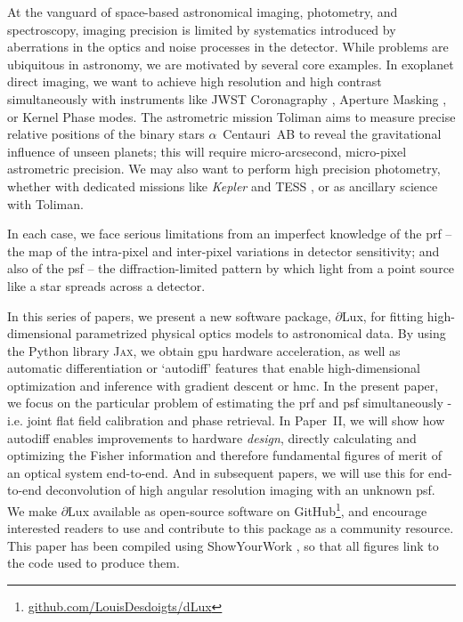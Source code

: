 \documentclass[]{spieman}
\newcommand\dlux{$\partial$Lux\xspace}
\begin{document}
At the vanguard of space-based astronomical imaging, photometry, and spectroscopy, imaging precision is limited by systematics introduced by aberrations in the optics and noise processes in the detector. While problems are ubiquitous in astronomy, we are motivated by several core examples. In exoplanet direct imaging, we want to achieve high resolution and high contrast simultaneously with instruments like JWST Coronagraphy \cite{Girard2022}, Aperture Masking \cite{Sivaramakrishnan2022}, or Kernel Phase \cite{Martinache2010,Kammerer2022} modes. The astrometric mission Toliman \cite{tuthill2018} aims to measure precise relative positions of the binary stars $\alpha$~Centauri~AB to reveal the gravitational influence of unseen planets; this will require micro-arcsecond, micro-pixel astrometric precision. We may also want to perform high precision photometry, whether with dedicated missions like \textit{Kepler} \cite{Borucki2010} and TESS \cite{Ricker2015}, or as ancillary science with Toliman. 

In each case, we face serious limitations from an imperfect knowledge of the \ac{prf} -- the map of the intra-pixel and inter-pixel variations in detector sensitivity; and also of the \ac{psf} -- the diffraction-limited pattern by which light from a point source like a star spreads across a detector.

In this series of papers, we present a new software package, \dlux, for fitting high-dimensional parametrized physical optics models to astronomical data. By using the Python library \textsc{Jax}\cite{jax}, we obtain \ac{gpu} hardware acceleration, as well as automatic differentiation or `autodiff' \cite{Margossian2018} features that enable high-dimensional optimization and inference with gradient descent or \ac{hmc}. In the present paper, we focus on the particular problem of estimating the \ac{prf} and \ac{psf} simultaneously - i.e. joint flat field calibration and phase retrieval. In Paper~II, we will show how autodiff enables improvements to hardware \textit{design}, directly calculating and optimizing the Fisher information and therefore fundamental figures of merit of an optical system end-to-end. And in subsequent papers, we will use this for end-to-end deconvolution of high angular resolution imaging with an unknown \ac{psf}. We make \dlux available as open-source software on GitHub\footnote{\href{https://github.com/LouisDesdoigts/dLux}{github.com/LouisDesdoigts/dLux}}, and encourage interested readers to use and contribute to this package as a community resource. This paper has been compiled using ShowYourWork \cite{Luger2021}, so that all figures link to the code used to produce them.
\end{document}
